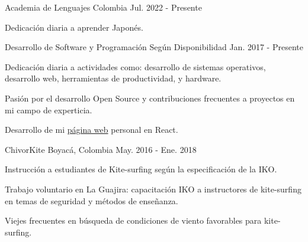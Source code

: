 

\begin{cventries}

	{Academia de Lenguajes} %
	{Colombia} %
	{Jul. 2022 {-} Presente} %
	{
		\begin{cvitems} %
			\item {Dedicación diaria a aprender Japonés.}
		\end{cvitems}
	}

	{Desarrollo de Software y Programación} %
	{Según Disponibilidad} %
	{Jan. 2017 {-} Presente} %
	{
		\begin{cvitems} %
			\item {Dedicación diaria a actividades como: desarrollo de sistemas operativos, desarrollo web, herramientas de productividad, y hardware.}
			\item {Pasión por el desarrollo Open Source y contribuciones frecuentes a proyectos en mi campo de experticia.}
			\item {Desarrollo de mi \href{https://mantimantilla.github.io/}{página web} personal en React.}
		\end{cvitems}
	}

	{ChivorKite} %
	{Boyacá, Colombia} %
	{May. 2016 {-} Ene. 2018 } %
	{
		\begin{cvitems} %
			\item {Instrucción a estudiantes de Kite-surfing según la especificación de la IKO.}
			\item {Trabajo voluntario en La Guajira: capacitación IKO a instructores de kite-surfing en temas de seguridad y métodos de enseñanza.}
			\item {Viejes frecuentes en búsqueda de condiciones de viento favorables para kite-surfing.}
		\end{cvitems}
	}


\end{cventries}
